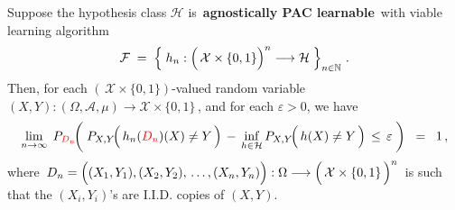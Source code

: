 
\vskip 1.0cm
\begin{remark}
\mbox{}\vskip 0.1cm
\noindent
Suppose the hypothesis class $\mathcal{H}$ is \,\textbf{agnostically PAC learnable}\,
with viable learning algorithm
\begin{equation*}
\mathcal{F} \; = \; \left\{\;
	h_{n} : \left(\,\mathcal{X}\overset{{\color{white}.}}{\times}\{0,1\}\right)^{n} \longrightarrow\mathcal{H}
	\;\right\}_{n\in\N}\,.
\end{equation*}
Then,
for each $\left(\,\mathcal{X}\times\{0,1\}\right)$-valued random variable
$(X,Y) : (\Omega,\mathcal{A},\mu) \longrightarrow \mathcal{X}\times\{0,1\}$\,,
and for each $\varepsilon > 0$, we have
\begin{equation*}
\underset{n\rightarrow\infty}{\lim}\;\,P_{{\color{red}D_{n}}}\!\!\left(\;
	P_{X,Y}\!\!\left(\,\overset{{\color{white}.}}{h}_{n}({\color{red}D_{n}})(X) \neq Y \,\right)
		\,-\,
		\underset{h\in\mathcal{H}}{\inf}\,P_{X,Y}\!\!\left(\,\overset{{\color{white}.}}{h}(X) \neq Y \,\right)
	\,\leq\,
		\varepsilon
	\;\right)
\;\; = \;\;
	1\,,
\end{equation*}
where
\,$D_{n} = \left((X_{1},Y_{1}),(X_{2},Y_{2}),\,\overset{{\color{white}\vert}}{\ldots}\,,(X_{n},Y_{n})\right)
	: \Omega \longrightarrow
	\left(\,\mathcal{X}\overset{{\color{white}.}}{\times}\{0,1\}\,\right)^{n}$\,
is such that the
$(X_{i},Y_{i})$'s are I.I.D. copies of $(X,Y)$.
\end{remark}


